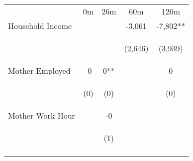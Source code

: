 \begin{tabular}{lcccc}
\hline \noalign{\smallskip} & 0m & 26m & 60m & 120m\\
\noalign{\smallskip}\hline \noalign{\smallskip}Household Income &  &  & -3,061 & -7,802**\\
 & \begin{footnotesize}\end{footnotesize} & \begin{footnotesize}\end{footnotesize} & \begin{footnotesize}(2,646)\end{footnotesize} & \begin{footnotesize}(3,939)\end{footnotesize}\\
\noalign{\smallskip}Mother Employed & -0 & 0** &  & 0\\
 & \begin{footnotesize}(0)\end{footnotesize} & \begin{footnotesize}(0)\end{footnotesize} & \begin{footnotesize}\end{footnotesize} & \begin{footnotesize}(0)\end{footnotesize}\\
\noalign{\smallskip}Mother Work Hour &  & -0 &  & \\
 & \begin{footnotesize}\end{footnotesize} & \begin{footnotesize}(1)\end{footnotesize} & \begin{footnotesize}\end{footnotesize} & \begin{footnotesize}\end{footnotesize}\\
\noalign{\smallskip}\hline\end{tabular}\\
